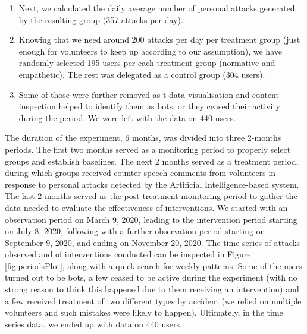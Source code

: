 \documentclass[preprint,12pt]{elsarticle}
\begin{document}
\begin{enumerate}
   \item Next, we calculated the daily average number of personal attacks generated by the resulting group (357 attacks per day).
   \item Knowing that we need around 200 attacks per day  per treatment group (just enough for volunteers to keep up according to our assumption), we have randomly selected 195 users per each treatment group (normative and empathetic). The rest was delegated as a control group (304 users). 
   \item Some of those were further removed as t data visualisation  and content inspection helped to identify them as bots, or they ceased their activity during the period. We were left with the data on 440 users.

   
 \end{enumerate}


The duration of the experiment, 6 months, was divided into three 2-months periods. The first two months served as a monitoring period to properly select groups and establish baselines. The next 2 months served as a treatment period, during which groups received counter-speech comments from volunteers in response to personal attacks detected by the Artificial Intelligence-based system. The last 2-months served as the post-treatment monitoring period to gather the data needed to evaluate the effectiveness of interventions.
We started with an observation period on March 9, 2020, leading to  the intervention period starting on July 8, 2020,  following with  a further observation period starting on September 9, 2020,
and ending on November 20, 2020. The time series of attacks observed
and of interventions conducted can be inspected in Figure
\ref{fig:periodsPlot}, along with a quick search for weekly patterns.
Some of the users turned out to be bots, a few ceased to be active
during the experiment (with no strong reason to think this happened due
to them receiving an intervention) and a few received treatment of two
different types by accident (we relied on multiple volunteers and such
mistakes were likely to happen). Ultimately, in the time series data, we
ended up with data on 440 users.
\end{document}
